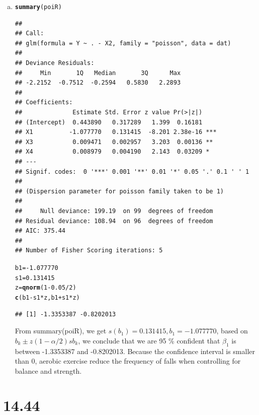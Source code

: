 \documentclass{article}\usepackage[]{graphicx}\usepackage[]{color}
\makeatletter
\newcommand{\hlnum}[1]{\textcolor[rgb]{0.686,0.059,0.569}{#1}}%
\newcommand{\hlopt}[1]{\textcolor[rgb]{0,0,0}{#1}}%
\newcommand{\hlstd}[1]{\textcolor[rgb]{0.345,0.345,0.345}{#1}}%
\newcommand{\hlkwb}[1]{\textcolor[rgb]{0.69,0.353,0.396}{#1}}%
\newcommand{\hlkwd}[1]{\textcolor[rgb]{0.737,0.353,0.396}{\textbf{#1}}}%
\newenvironment{kframe}{%
 \def\at@end@of@kframe{}%
 \ifinner\ifhmode%
  \def\at@end@of@kframe{\end{minipage}}%
  \begin{minipage}{\columnwidth}%
 \fi\fi%
 \def\FrameCommand##1{\hskip\@totalleftmargin \hskip-\fboxsep
 \colorbox{shadecolor}{##1}\hskip-\fboxsep
     \hskip-\linewidth \hskip-\@totalleftmargin \hskip\columnwidth}%
 \MakeFramed {\advance\hsize-\width
   \@totalleftmargin\z@ \linewidth\hsize
   \@setminipage}}%
 {\par\unskip\endMakeFramed%
 \at@end@of@kframe}
\newenvironment{knitrout}{}{} %
\makeatother
\begin{document}
\begin{enumerate}[(a)]
\item

\begin{knitrout}
\color{fgcolor}\begin{kframe}
\begin{alltt}
  \hlkwd{summary}\hlstd{(poiR)}
\end{alltt}
\begin{verbatim}
## 
## Call:
## glm(formula = Y ~ . - X2, family = "poisson", data = dat)
## 
## Deviance Residuals: 
##     Min       1Q   Median       3Q      Max  
## -2.2152  -0.7512  -0.2594   0.5830   2.2893  
## 
## Coefficients:
##              Estimate Std. Error z value Pr(>|z|)    
## (Intercept)  0.443890   0.317289   1.399  0.16181    
## X1          -1.077770   0.131415  -8.201 2.38e-16 ***
## X3           0.009471   0.002957   3.203  0.00136 ** 
## X4           0.008979   0.004190   2.143  0.03209 *  
## ---
## Signif. codes:  0 '***' 0.001 '**' 0.01 '*' 0.05 '.' 0.1 ' ' 1
## 
## (Dispersion parameter for poisson family taken to be 1)
## 
##     Null deviance: 199.19  on 99  degrees of freedom
## Residual deviance: 108.94  on 96  degrees of freedom
## AIC: 375.44
## 
## Number of Fisher Scoring iterations: 5
\end{verbatim}
\begin{alltt}
  \hlstd{b1} \hlkwb{=} \hlopt{-}\hlnum{1.077770}
  \hlstd{s1} \hlkwb{=} \hlnum{0.131415}
  \hlstd{z} \hlkwb{=} \hlkwd{qnorm}\hlstd{(}\hlnum{1}\hlopt{-}\hlnum{0.05}\hlopt{/}\hlnum{2}\hlstd{)}
  \hlkwd{c}\hlstd{(b1}\hlopt{-}\hlstd{s1}\hlopt{*}\hlstd{z, b1}\hlopt{+}\hlstd{s1}\hlopt{*}\hlstd{z)}
\end{alltt}
\begin{verbatim}
## [1] -1.3353387 -0.8202013
\end{verbatim}
\end{kframe}
\end{knitrout}

\qquad From summary(poiR), we get $s(b_1) = 0.131415, b_1 = -1.077770$, based on $b_k \pm z(1-\alpha/2)s{b_k}$, we conclude that we are 95 \% confident that $\beta_1$ is between -1.3353387 and -0.8202013. Because the confidence interval is smaller than 0, aerobic exercise reduce the frequency of falls when controlling for balance and strength.

\end{enumerate}

\section{14.44}
\end{document}
